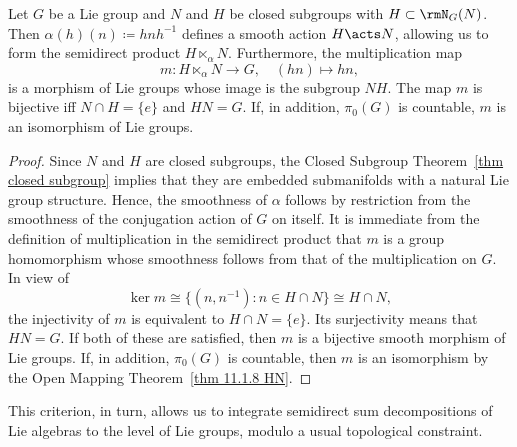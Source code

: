 \begin{prop}\label{prop 11.1.18 HN}
    Let $G$ be a Lie group and $N$ and $H$ be closed subgroups with $H\subset \rmN_G(N)$. Then $\alpha(h)(n)\coloneqq hnh^{-1}$ defines a smooth action $H\acts N$, allowing us to form the semidirect product $H\ltimes_\alpha N$. Furthermore, the multiplication map 
    \[m:H\ltimes_\alpha N\to G,\quad (hn)\mapsto hn,\]
    is a morphism of Lie groups whose image is the subgroup $NH$. The map $m$ is bijective iff $N\cap H=\{e\}$ and $HN=G$. If, in addition, $\pi_0(G)$ is countable, $m$ is an isomorphism of Lie groups.
\end{prop}
\begin{proof}
    Since $N$ and $H$ are closed subgroups, the Closed Subgroup Theorem~\ref{thm closed subgroup} implies that they are embedded submanifolds with a natural Lie group structure. Hence, the smoothness of $\alpha$ follows by restriction from the smoothness of the conjugation action of $G$ on itself. It is immediate from the definition of multiplication in the semidirect product  that $m$ is a group homomorphism whose smoothness follows from that of the multiplication on $G$. In view of 
    \[\ker m\cong \{(n,n^{-1}):n\in H\cap N\}\cong H\cap N,\]
    the injectivity of $m$ is equivalent to $H\cap N=\{e\}$. Its surjectivity means that $HN=G$. If both of these are satisfied, then $m$ is a bijective smooth morphism of Lie groups. If, in addition, $\pi_0(G)$ is countable, then $m$ is an isomorphism by the Open Mapping Theorem~\ref{thm 11.1.8 HN}.
\end{proof}

This criterion, in turn, allows us to integrate semidirect sum decompositions of Lie algebras to the level of Lie groups, modulo a usual topological constraint.

